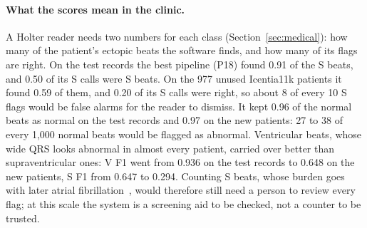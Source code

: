 \paragraph{What the scores mean in the clinic.} A Holter reader needs two numbers for each class (Section~\ref{sec:medical}): how many of the patient's ectopic beats the software finds, and how many of its flags are right. On the test records the best pipeline (P18) found 0.91 of the S beats, and 0.50 of its S calls were S beats. On the 977 unused Icentia11k patients it found 0.59 of them, and 0.20 of its S calls were right, so about 8 of every 10 S flags would be false alarms for the reader to dismiss. It kept 0.96 of the normal beats as normal on the test records and 0.97 on the new patients: 27 to 38 of every 1,000 normal beats would be flagged as abnormal. Ventricular beats, whose wide QRS looks abnormal in almost every patient, carried over better than supraventricular ones: V F1 went from 0.936 on the test records to 0.648 on the new patients, S F1 from 0.647 to 0.294. Counting S beats, whose burden goes with later atrial fibrillation~\cite{binici2010}, would therefore still need a person to review every flag; at this scale the system is a screening aid to be checked, not a counter to be trusted.
